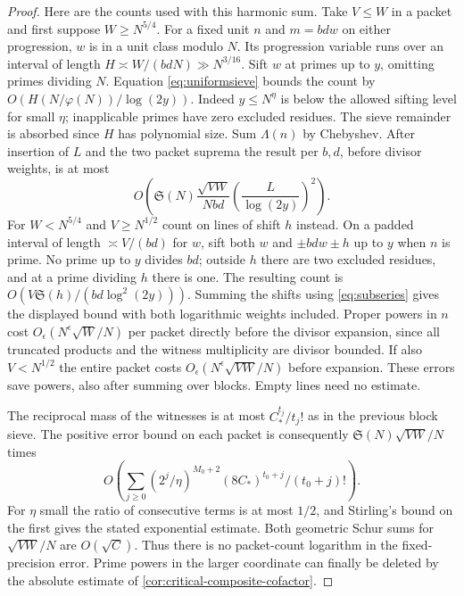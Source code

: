 \documentclass[11pt,a4paper]{article}
\numberwithin{equation}{section}
\newcommand{\SSS}{\mathfrak S}
\begin{document}
\begin{proof}
Here are the counts used with this harmonic sum. Take $V\le W$
in a packet and first suppose $W\ge N^{5/4}$. For a fixed
unit $n$ and $m=bdw$ on either progression, $w$ is in a unit
class modulo $N$. Its progression variable runs over an interval
of length $H\asymp W/(bdN)\gg N^{3/16}$. Sift $w$ at primes
up to $y$, omitting primes dividing $N$. Equation
\eqref{eq:uniformsieve} bounds the count by
$O(H(N/\varphi(N))/\log(2y))$. Indeed $y\le N^\eta$ is
below the allowed sifting level for small $\eta$; inapplicable
primes have zero excluded residues. The sieve remainder is
absorbed since $H$ has polynomial size. Sum $\Lambda(n)$ by
Chebyshev. After insertion of $L$ and the two packet suprema
the result per $b,d$, before divisor weights, is at most
\[
 O\left(\SSS(N)\frac{\sqrt{VW}}{Nbd}
                 \left(\frac{L}{\log(2y)}\right)^2\right).
\]
For $W<N^{5/4}$ and $V\ge N^{1/2}$ count on lines of shift
$h$ instead. On a padded interval of length $\asymp V/(bd)$
for $w$, sift both $w$ and $\pm bdw\pm h$ up to $y$ when
$n$ is prime. No prime up to $y$ divides $bd$; outside $h$
there are two excluded residues, and at a prime dividing $h$
there is one. The resulting count is
$O(V\SSS(h)/(bd\log^2(2y)))$. Summing the shifts using
\eqref{eq:subseries} gives the displayed bound with both
logarithmic weights included. Proper powers in $n$ cost
$O_\epsilon(N^\epsilon\sqrt W/N)$ per packet directly before
the divisor expansion, since all truncated products and the
witness multiplicity are divisor bounded. If also $V<N^{1/2}$
the entire packet costs $O_\epsilon(N^\epsilon\sqrt{VW}/N)$
before expansion. These errors save powers, also after summing
over blocks. Empty lines need no estimate.

The reciprocal mass of the witnesses is at most $C_*^{t_j}/t_j!$
as in the previous block sieve. The positive error bound on each
packet is consequently $\SSS(N)\sqrt{VW}/N$ times
\[
 O\left(\sum_{j\ge0}(2^j/\eta)^{M_0+2}
                      (8C_*)^{t_0+j}/(t_0+j)!\right).
\]
For $\eta$ small the ratio of consecutive terms is at most
$1/2$, and Stirling's bound on the first gives the stated
exponential estimate. Both geometric Schur sums for
$\sqrt{VW}/N$ are $O(\sqrt C)$. Thus there is no packet-count
logarithm in the fixed-precision error. Prime powers in the
larger coordinate can finally be deleted by the absolute estimate
of \cref{cor:critical-composite-cofactor}.
\end{proof}
\end{document}
